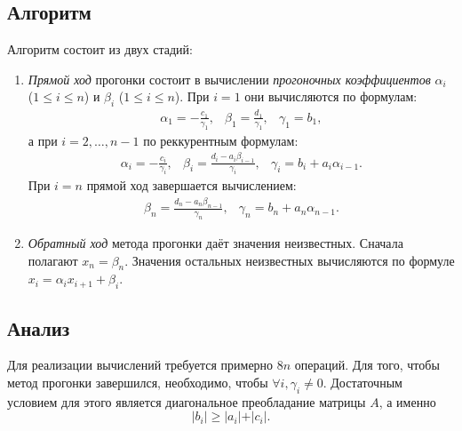 \documentclass[10pt]{article}
\newcommand{\mys}{\textit}
\begin{document}
	\subsection{Алгоритм}
		Алгоритм состоит из двух стадий:
		\begin{enumerate}
			\item \mys{Прямой ход} прогонки состоит в вычислении \mys{прогоночных коэффициентов} 
				  $\alpha_i$ ($1 \le i \le n$) и $\beta_i$ ($1 \le i \le n$). При $i = 1$ они вычисляются по формулам:
				  \begin{equation}
				      \begin{matrix}
						  \alpha_1 = - \frac{c_1}{\gamma_1}, &
						  \beta_1  = \frac{d_1}{\gamma_1}, &
						  \gamma_1 = b_1,
				  	  \end{matrix} 
			  	  \end{equation}
				  а при $i = 2, \dotsc, n-1$ по реккурентным формулам:
				  \begin{equation}
				      \begin{matrix}
						  \alpha_i = - \frac{c_i}{\gamma_i}, &
						  \beta_i  = \frac{d_i - a_i \beta_{i-1}}{\gamma_i}, &
						  \gamma_i = b_i + a_i \alpha_{i-1}.
				  	  \end{matrix}
			  	  \end{equation}
				  При $i = n$ прямой ход завершается вычислением:
				  \begin{equation}
				      \begin{matrix}
						  \beta_n  = \frac{d_n - a_n \beta_{n-1}}{\gamma_n}, &
						  \gamma_n = b_n + a_n \alpha_{n-1}.
				  	  \end{matrix} 
			  	  \end{equation}

			  \item \mys{Обратный ход} метода прогонки даёт значения неизвестных. Сначала полагают $x_n = \beta_n$.
				    Значения остальных неизвестных вычисляются по формуле $x_i = \alpha_i x_{i+1} + \beta_i$.
		\end{enumerate}
	
	\subsection{Анализ}
		Для реализации вычислений требуется примерно $8n$ операций.
		Для того, чтобы метод прогонки завершился, необходимо, чтобы $\forall i, \gamma_i \not = 0$. 
		Достаточным условием для этого является диагональное преобладание матрицы $A$, 
		а именно 
		\begin{equation}\label{eq:condition}
			\vert b_i \vert \ge \vert a_i \vert + \vert c_i \vert.
		\end{equation}
\end{document}
